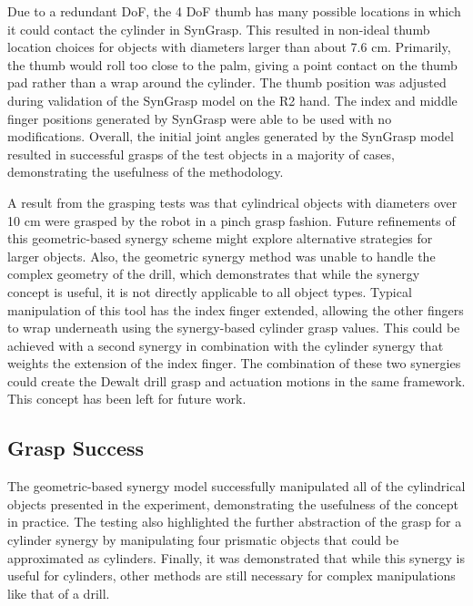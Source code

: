 \documentclass[runningheads,a4paper]{llncs}
\begin{document}
Due to a redundant DoF, the 4 DoF thumb has many possible locations in which it could contact the cylinder in SynGrasp. 
This resulted in non-ideal thumb location choices for objects with diameters larger than about 7.6 cm. Primarily, the thumb would roll too close to the palm, giving a point contact on the thumb pad rather than a wrap around the cylinder. The thumb position was adjusted during validation of the SynGrasp model on the R2 hand. The index and middle finger positions generated by SynGrasp were able to be used with no modifications. Overall, the initial joint angles generated by the SynGrasp model resulted in successful grasps of the test objects in a majority of cases, demonstrating the usefulness of the methodology. 

A result from the grasping tests was that cylindrical objects with diameters over 10 cm were grasped by the robot in a pinch grasp fashion. Future refinements of this geometric-based synergy scheme might explore alternative strategies for larger objects. Also, the geometric synergy method was unable to handle the complex geometry of the drill, which demonstrates that while the synergy concept is useful, it is not directly applicable to all object types. Typical manipulation of this tool has the index finger extended, allowing the other fingers to wrap underneath using the synergy-based cylinder grasp values. This could be achieved with a second synergy in combination with the cylinder synergy that weights the extension of the index finger. The combination of these two synergies could create the Dewalt drill grasp and actuation motions in the same framework. This concept has been left for future work. 

\subsection{Grasp Success}

The geometric-based synergy model successfully manipulated all of the cylindrical objects presented in the experiment, demonstrating the usefulness of the concept in practice. The testing also highlighted the further abstraction of the grasp for a cylinder synergy by manipulating four prismatic objects that could be approximated as cylinders. Finally, it was demonstrated that while this synergy is useful for cylinders, other methods are still necessary for complex manipulations like that of a drill.
\end{document}

